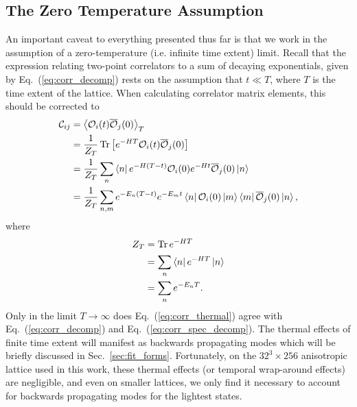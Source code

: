 \subsection{The Zero Temperature Assumption}
An important caveat to everything presented thus far is that we work in the assumption of a zero-temperature (i.e. infinite time extent) limit. Recall that the expression relating two-point correlators to a sum of decaying exponentials, given by Eq.~(\ref{eq:corr_decomp}) rests on the assumption that $t\ll T$, where $T$ is the time extent of the lattice. When calculating correlator matrix elements, this should be corrected to
\begin{equation}\label{eq:corr_thermal}
    \begin{aligned}
        \mathcal{C}_{i j} &=\left\langle\mathcal{O}_{i}(t) \overline{\mathcal{O}}_{j}(0)\right\rangle_{T} \\
        &=\frac{1}{Z_{T}} \operatorname{Tr}\left[e^{-H T} \mathcal{O}_{i}(t) \overline{\mathcal{O}}_{j}(0)\right] \\
        &=\frac{1}{Z_{T}} \sum_{n}\bra n e^{-H(T-t)} \mathcal{O}_{i}(0) e^{-H t} \overline{\mathcal{O}}_{j}(0)\ket n \\
        &=\frac{1}{Z_{T}} \sum_{n, m} e^{-E_{n}(T-t)} e^{-E_{m} t}\bra n \mathcal{O}_{i}(0)\ket m \bra m \overline{\mathcal{O}}_{j}(0)\ket n,
        \end{aligned}
\end{equation}
where
\begin{equation}
    \begin{aligned}
        Z_{T} & = \operatorname{Tr} e^{-H T} \\
        &=\sum_{n}\bra n e^{-H T}\ket n \\
        &=\sum_{n} e^{-E_{n} T}.
    \end{aligned}
\end{equation}
Only in the limit $T\rightarrow \infty$ does Eq.~(\ref{eq:corr_thermal}) agree with Eq.~(\ref{eq:corr_decomp}) and Eq.~(\ref{eq:corr_spec_decomp}). The thermal effects of finite time extent will manifest as backwards propagating modes which will be briefly discussed in Sec.~\ref{sec:fit_forms}. Fortunately, on the $32^3\times 256$ anisotropic lattice used in this work, these thermal effects (or temporal wrap-around effects) are negligible, and even on smaller lattices, we only find it necessary to account for backwards propagating modes for the lightest states.
